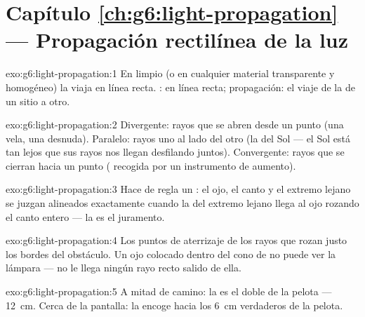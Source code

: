 \section*{Capítulo \ref{ch:g6:light-propagation} --- Propagación rectilínea de la luz}

\begin{solution}{exo:g6:light-propagation:1}
En  limpio (o en cualquier material transparente y homogéneo) la
 viaja en línea recta. : en línea recta;
propagación: el viaje de la  de un sitio a otro.
\end{solution}

\begin{solution}{exo:g6:light-propagation:2}
Divergente: rayos que se abren desde un punto (una vela, una
 desnuda). Paralelo: rayos uno al lado del otro (la  del
Sol --- el Sol está tan lejos que sus rayos nos llegan desfilando
juntos). Convergente: rayos que se cierran hacia un punto (
recogida por un instrumento de aumento).
\end{solution}

\begin{solution}{exo:g6:light-propagation:3}
Hace de regla un : el ojo, el canto y el extremo lejano
se juzgan alineados exactamente cuando la  del extremo lejano
llega al ojo rozando el canto entero --- la
 es el juramento.
\end{solution}

\begin{solution}{exo:g6:light-propagation:4}
Los puntos de aterrizaje de los rayos que rozan justo los bordes del
obstáculo. Un ojo colocado dentro del cono de  no puede ver la
lámpara --- no le llega ningún rayo recto salido de ella.
\end{solution}

\begin{solution}{exo:g6:light-propagation:5}
A mitad de camino: la  es el doble de la pelota ---
\qty{12}{cm}. Cerca de la pantalla: la  encoge hacia los
\qty{6}{cm} verdaderos de la pelota.
\end{solution}

